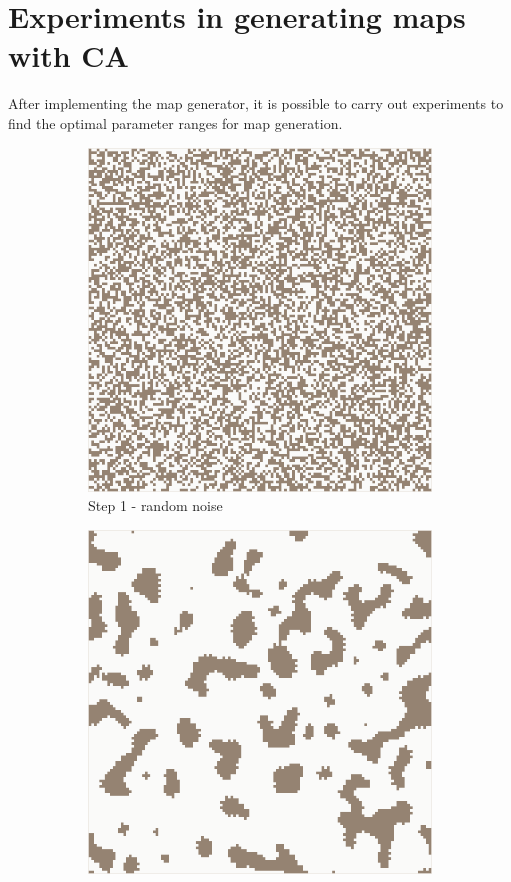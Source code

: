 \documentclass[12pt]{report}
\begin{document}
\section{Experiments in generating maps with CA}

After implementing the map generator, it is possible to carry out experiments to find the optimal parameter ranges for map generation.

\begin{figure}[h]
	\centering
	\begin{subfigure}[b]{0.4\textwidth}
		\centering
		\includegraphics[width=\textwidth]{images/step1}
		\caption{Step 1 - random noise} 
	\end{subfigure}
	\hfill
	\begin{subfigure}[b]{0.4\textwidth}
		\centering
		\includegraphics[width=\textwidth]{images/step2}

\end{subfigure}
\end{figure}
\end{document}

